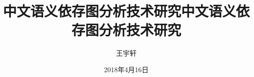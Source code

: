 
\subject{计算机科学与技术}
\author{王宇轩}
\date{2018年4月16日}

\ifxueweidoctor
\title{中文语义依存图分析技术研究} %

\fi
\ifxueweimaster
  \title{中文语义依存图分析技术研究}
\fi

\makecover
\clearpage
\setcounter{page}{1}